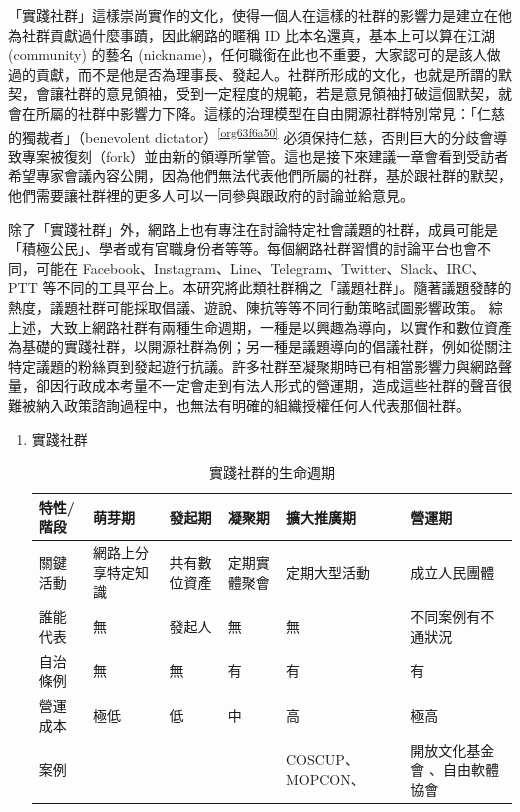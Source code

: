 \documentclass[12pt,a4paper]{article}
\begin{document}
\begin{enumerate}
「實踐社群」這樣崇尚實作的文化，使得一個人在這樣的社群的影響力是建立在他為社群貢獻過什麼事蹟，因此網路的暱稱 ID  比本名還真，基本上可以算在江湖 (community) 的藝名 (nickname)，任何職銜在此也不重要，大家認可的是該人做過的貢獻，而不是他是否為理事長、發起人。社群所形成的文化，也就是所謂的默契，會讓社群的意見領袖，受到一定程度的規範，若是意見領袖打破這個默契，就會在所屬的社群中影響力下降。這樣的治理模型在自由開源社群特別常見：「仁慈的獨裁者」（benevolent dictator）\textsuperscript{\ref{org63f6a50}} 必須保持仁慈，否則巨大的分歧會導致專案被復刻（fork）並由新的領導所掌管。這也是接下來建議一章會看到受訪者希望專家會議內容公開，因為他們無法代表他們所屬的社群，基於跟社群的默契，他們需要讓社群裡的更多人可以一同參與跟政府的討論並給意見。

除了「實踐社群」外，網路上也有專注在討論特定社會議題的社群，成員可能是「積極公民」、學者或有官職身份者等等。每個網路社群習慣的討論平台也會不同，可能在 Facebook、Instagram、Line、Telegram、Twitter、Slack、IRC、PTT 等不同的工具平台上。本研究將此類社群稱之「議題社群」。隨著議題發酵的熱度，議題社群可能採取倡議、遊說、陳抗等等不同行動策略試圖影響政策。
綜上述，大致上網路社群有兩種生命週期，一種是以興趣為導向，以實作和數位資產為基礎的實踐社群，以開源社群為例；另一種是議題導向的倡議社群，例如從關注特定議題的粉絲頁到發起遊行抗議。許多社群至凝聚期時已有相當影響力與網路聲量，卻因行政成本考量不一定會走到有法人形式的營運期，造成這些社群的聲音很難被納入政策諮詢過程中，也無法有明確的組織授權任何人代表那個社群。
\begin{enumerate}
\item 實踐社群
\label{sec:org2b38a46}
\begin{table}[htbp]
\caption{\label{tab:org0f4e7f9}
實踐社群的生命週期}
\centering
{} \footnotesize \setlength{\tabcolsep}{3pt}
\begin{tabular}{lp{80pt}llp{86pt}p{86pt}}
\toprule
特性/階段 & 萌芽期 & 發起期 & 凝聚期 & 擴大推廣期 & 營運期\\
\midrule
關鍵活動 & 網路上分享特定知識 & 共有數位資產 & 定期實體聚會 & 定期大型活動 & 成立人民團體\\
誰能代表 & 無 & 發起人 & 無 & 無 & 不同案例有不通狀況\\
自治條例 & 無 & 無 & 有 & 有 & 有\\
營運成本 & 極低 & 低 & 中 & 高 & 極高\\
案例 &  &  &  & COSCUP、MOPCON、 & 開放文化基金會 、自由軟體協會\\
\bottomrule
\end{tabular}
\end{table}

\end{enumerate}
\end{enumerate}
\end{document}
